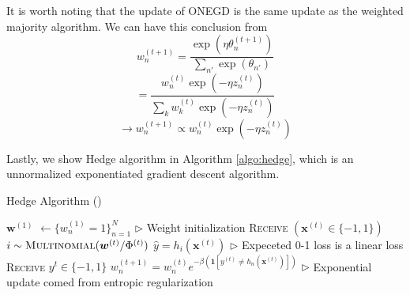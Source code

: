\documentclass[11pt]{article}
\begin{document}
It is worth noting that the update of ONEGD is the same update as the weighted majority algorithm. We can have this conclusion from
$$
w_n^{(t+1)} = \frac{\exp(\eta \theta_n^{(t+1)})}{\sum_{n'}\exp(\theta_{n'})}
$$
$$
=\frac{w_n^{(t)}\exp(-\eta z_n^{(t)})}{\sum_k w_k^{(t)}\exp(-\eta z_n^{(t)})}
$$
$$
\rightarrow w_n^{(t+1)} \propto w_n^{(t)}\exp(-\eta z_n^{(t)})
$$

Lastly, we show Hedge algorithm in Algorithm \ref{algo:hedge}, which is an unnormalized exponentiated gradient descent algorithm.
\begin{algorithm}[H]
\caption{Hedge Algorithm (\beta)}
\label{algo:hedge}
\begin{algorithmic}[1]
\STATE $\textbf{w}^{(1)}$ $\leftarrow \{w_n^{(1)} = 1\}_{n=1}^N$ \hfill $\triangleright$ Weight initialization
\STATE \textsc{Receive} $(\bm{x}^(t) \in \{-1, 1\})$ \hfill
\STATE $i \sim \textsc{Multinomial}(\bm{w}^{(t)}/\Phi^{(t)})$ \hfill
\STATE $\hat{y} = h_i(\bm{x}^{(t)})$ \hfill $\triangleright$ Expeceted 0-1 loss is a linear loss
\STATE \textsc{Receive} $y^t \in \{-1, 1\}$ \hfill
\STATE $w_n^{(t+1)} = w_n^{(t)}e^{-\beta (\bm{1}[y^{(t)} \neq h_n(\bm{x}^{(t)})])}$ \hfill $\triangleright$ Exponential update comed from entropic regularization
\ENDFOR
\end{algorithmic}
\end{algorithm}


{


}


\end{document}
